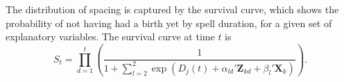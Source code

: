 \documentclass[12pt,letterpaper]{article}
\begin{document}
The distribution of spacing is captured by the survival curve, which shows the probability 
of not having had a birth yet by spell duration, for a given set of explanatory variables.
The survival curve at time $t$ is 
\begin{equation}
\label{eq:survival}
S_{t} 
= 
\prod_{d=1}^t
\left(
\frac{ 1 }
{1 + \sum_{l=2}^2 \exp(D_j(t) + \alpha_{ld}'\mathbf{Z}_{kd} + \beta_l'\mathbf{X}_{k})}
\right).
\end{equation}

\end{document}
